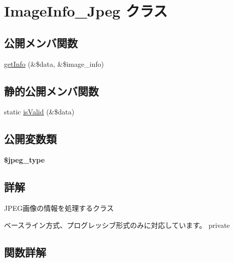 \hypertarget{class_image_info___jpeg}{}\section{Image\+Info\+\_\+\+Jpeg クラス}
\label{class_image_info___jpeg}
\subsection*{公開メンバ関数}
\begin{DoxyCompactItemize}
\item 
\hyperlink{class_image_info___jpeg_aad43653da2d84f9d503561f110fa819e}{get\+Info} (\&\$data, \&\$image\+\_\+info)
\end{DoxyCompactItemize}
\subsection*{静的公開メンバ関数}
\begin{DoxyCompactItemize}
\item 
static \hyperlink{class_image_info___jpeg_ae6336be504ffe67dd34964fa4557d338}{is\+Valid} (\&\$data)
\end{DoxyCompactItemize}
\subsection*{公開変数類}
\begin{DoxyCompactItemize}
\item 
\hypertarget{class_image_info___jpeg_ad65b973cd1b699c17e15f2b9689039c2}{}{\bfseries \$jpeg\+\_\+type}\label{class_image_info___jpeg_ad65b973cd1b699c17e15f2b9689039c2}

\end{DoxyCompactItemize}


\subsection{詳解}
J\+P\+E\+G画像の情報を処理するクラス

ベースライン方式、プログレッシブ形式のみに対応しています。  private 

\subsection{関数詳解}
\hypertarget{class_image_info___jpeg_aad43653da2d84f9d503561f110fa819e}{}
